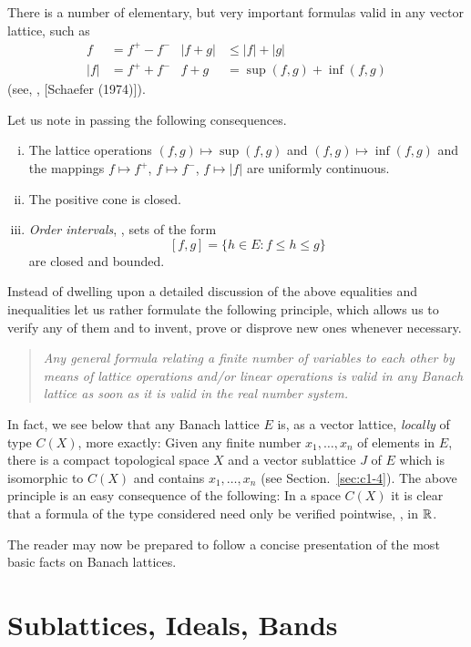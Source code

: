 There is a number of elementary, but very important formulas valid in any vector lattice, such as
\begin{align*}
f &= f^{+} - f^{-} & |f + g| &\leq |f| + |g| \\
|f| &= f^{+} + f^{-} & f + g &= \sup(f,g) + \inf(f,g)
\end{align*}
(see, \eg, [Schaefer (1974)]).

Let us note in passing the following consequences.
%
\begin{enumerate}[(i)]
\item 
The lattice operations $ (f,g) \mapsto \sup(f,g) $ and $ (f,g) \mapsto \inf(f,g) $ and the mappings $ f \mapsto f^{+} $, $ f \mapsto f^{-} $, $ f \mapsto |f| $ are uniformly continuous.

\item 
The positive cone is closed.

\item 
\emph{Order intervals}, \ie, sets of the form
\[
	\left[ f,g \right] = \{ h \in E \colon f \leq h \leq g \}
\]
are closed and bounded.
\end{enumerate}
Instead of dwelling upon a detailed discussion of the above equalities and inequalities let us rather formulate the following principle, which allows us to verify any of them and to invent, prove or disprove new ones whenever necessary.
\begin{quote}
\emph{Any general formula relating a finite number of \emph{variables} to each other by means of lattice operations and/or linear operations is valid in any Banach lattice as soon as it is valid in the real number system.}
\end{quote}
In fact, we see below that any Banach lattice $ E $ is, as a vector lattice, \emph{locally} of type $ C(X) $, more exactly:
Given any finite number $ x_{1},\ldots,x_{n} $ of elements in $ E $, there is a compact topological space $ X $ and a vector sublattice $ J $ of $ E $ which is isomorphic to $ C(X) $ and contains $ x_{1},\ldots,x_{n} $ (see Section.~\ref{sec:c1-4}).
The above principle is an easy consequence of the following:
In a space $ C(X) $ it is clear that a formula of the type considered need only be verified pointwise, \ie,  in $ \mathbb{R} $.

The reader may now be prepared to follow a concise presentation of the most basic facts on Banach lattices.
\section{Sublattices, Ideals, Bands}\label{sec:c1-1}

